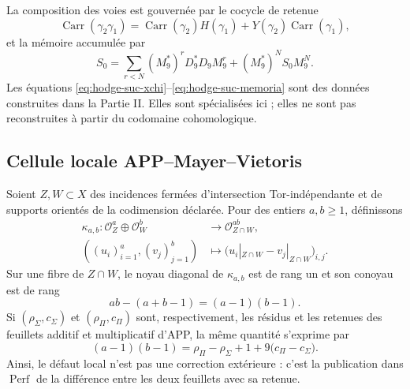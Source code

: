 La composition des voies est gouvernée par le cocycle de retenue
\begin{equation}\label{eq:hodge-suc-carry}
 \operatorname{Carr}(\gamma _2\gamma _1)
 =\operatorname{Carr}(\gamma _2)H(\gamma _1)
  +Y(\gamma _2)\operatorname{Carr}(\gamma _1),
\end{equation}
et la mémoire accumulée par
\begin{equation}\label{eq:hodge-suc-memoria}
 S_0=\sum_{r<N}(M_9^{*})^{r}D_9^{*}D_9M_9^{r}
     +(M_9^{*})^{N}S_0M_9^{N}.
\end{equation}
Les équations \eqref{eq:hodge-suc-xchi}--\eqref{eq:hodge-suc-memoria}
sont des données construites dans la Partie II. Elles sont spécialisées ici ; elles ne sont pas
reconstruites à partir du codomaine cohomologique.

\subsection*{Cellule locale APP--Mayer--Vietoris}

Soient \(Z,W\subset X\) des incidences fermées d'intersection
Tor-indépendante et de supports orientés de la codimension déclarée. Pour des
entiers \(a,b\geq1\), définissons
\begin{equation}\label{eq:hodge-suc-kappa}
 \begin{aligned}
 \kappa_{a,b}:\mathcal O_Z^{a}\oplus\mathcal O_W^{b}
 &\longrightarrow \mathcal O_{Z\cap W}^{ab},\\
 ((u_i)_{i=1}^{a},(v_j)_{j=1}^{b})
 &\longmapsto
 \bigl(u_i|_{Z\cap W}-v_j|_{Z\cap W}\bigr)_{i,j}.
 \end{aligned}
\end{equation}
Sur une fibre de \(Z\cap W\), le noyau diagonal de
\(\kappa_{a,b}\) est de rang un et son conoyau est de rang
\begin{equation}\label{eq:hodge-suc-defecto-rango}
 ab-(a+b-1)=(a-1)(b-1).
\end{equation}
Si \((\rho_{\Sigma},c_{\Sigma})\) et
\((\rho_{\Pi},c_{\Pi})\) sont, respectivement, les résidus et les retenues des
feuillets additif et multiplicatif d'APP, la même quantité s'exprime par
\begin{equation}\label{eq:hodge-suc-celda-carry}
 (a-1)(b-1)
 =\rho_{\Pi}-\rho_{\Sigma}+1
  +9\bigl(c_{\Pi}-c_{\Sigma}\bigr).
\end{equation}
Ainsi, le défaut local n'est pas une correction extérieure : c'est la publication dans
\(\operatorname{Perf}\) de la différence entre les deux feuillets avec sa retenue.


